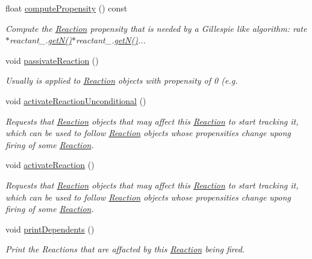 \begin{DoxyCompactItemize}
float \hyperlink{classchem_1_1Reaction_a676eec8b5b28c191c555a944a2c03857}{compute\-Propensity} () const 
\begin{DoxyCompactList}\small\item\em Compute the \hyperlink{classchem_1_1Reaction}{Reaction} propensity that is needed by a Gillespie like algorithm\-: rate$\ast$reactant\-\_.\hyperlink{classchem_1_1Reaction_a35c63f46973b5cda157661ab9bffb682}{get\-N()}$\ast$reactant\-\_.\hyperlink{classchem_1_1Reaction_a35c63f46973b5cda157661ab9bffb682}{get\-N()}... \end{DoxyCompactList}\item 
void \hyperlink{classchem_1_1Reaction_a6990bf5dfc31f04bcab6bda8392174aa}{passivate\-Reaction} ()
\begin{DoxyCompactList}\small\item\em Usually is applied to \hyperlink{classchem_1_1Reaction}{Reaction} objects with propensity of 0 (e.\-g. \end{DoxyCompactList}\item 
void \hyperlink{classchem_1_1Reaction_aea9154fdd7008baf9ee41c13fea8ea5b}{activate\-Reaction\-Unconditional} ()
\begin{DoxyCompactList}\small\item\em Requests that \hyperlink{classchem_1_1Reaction}{Reaction} objects that may affect this \hyperlink{classchem_1_1Reaction}{Reaction} to start tracking it, which can be used to follow \hyperlink{classchem_1_1Reaction}{Reaction} objects whose propensities change upong firing of some \hyperlink{classchem_1_1Reaction}{Reaction}. \end{DoxyCompactList}\item 
void \hyperlink{classchem_1_1Reaction_afae5d992f176c16a21ec38fcf3d83649}{activate\-Reaction} ()
\begin{DoxyCompactList}\small\item\em Requests that \hyperlink{classchem_1_1Reaction}{Reaction} objects that may affect this \hyperlink{classchem_1_1Reaction}{Reaction} to start tracking it, which can be used to follow \hyperlink{classchem_1_1Reaction}{Reaction} objects whose propensities change upong firing of some \hyperlink{classchem_1_1Reaction}{Reaction}. \end{DoxyCompactList}\item 
void \hyperlink{classchem_1_1Reaction_af46fe664df202767dfac016253942799}{print\-Dependents} ()
\begin{DoxyCompactList}\small\item\em Print the Reactions that are affacted by this \hyperlink{classchem_1_1Reaction}{Reaction} being fired. \end{DoxyCompactList}\item 

\end{DoxyCompactItemize}
